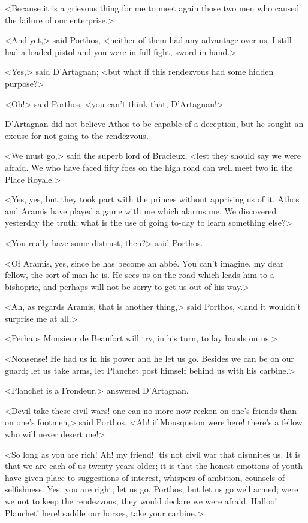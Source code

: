 <Because it is a grievous thing for me to meet again those two men who caused the failure of our enterprise.>

<And yet,> said Porthos, <neither of them had any advantage over us. I still had a loaded pistol and you were in full fight, sword in hand.>

<Yes,> said D'Artagnan; <but what if this rendezvous had some hidden purpose?>

<Oh!> said Porthos, <you can't think that, D'Artagnan!>

D'Artagnan did not believe Athos to be capable of a deception, but he sought an excuse for not going to the rendezvous.

<We must go,> said the superb lord of Bracieux, <lest they should say we were afraid. We who have faced fifty foes on the high road can well meet two in the Place Royale.>

<Yes, yes, but they took part with the princes without apprising us of it. Athos and Aramis have played a game with me which alarms me. We discovered yesterday the truth; what is the use of going to-day to learn something else?>

<You really have some distrust, then?> said Porthos.

<Of Aramis, yes, since he has become an abbé. You can't imagine, my dear fellow, the sort of man he is. He sees us on the road which leads him to a bishopric, and perhaps will not be sorry to get us out of his way.>

<Ah, as regards Aramis, that is another thing,> said Porthos, <and it wouldn't surprise me at all.>

<Perhaps Monsieur de Beaufort will try, in his turn, to lay hands on us.>

<Nonsense! He had us in his power and he let us go. Besides we can be on our guard; let us take arms, let Planchet post himself behind us with his carbine.>

<Planchet is a Frondeur,> answered D'Artagnan.

<Devil take these civil wars! one can no more now reckon on one's friends than on one's footmen,> said Porthos. <Ah! if Mousqueton were here! there's a fellow who will never desert me!>

<So long as you are rich! Ah! my friend! 'tis not civil war that disunites us. It is that we are each of us twenty years older; it is that the honest emotions of youth have given place to suggestions of interest, whispers of ambition, counsels of selfishness. Yes, you are right; let us go, Porthos, but let us go well armed; were we not to keep the rendezvous, they would declare we were afraid. Halloo! Planchet! here! saddle our horses, take your carbine.>

